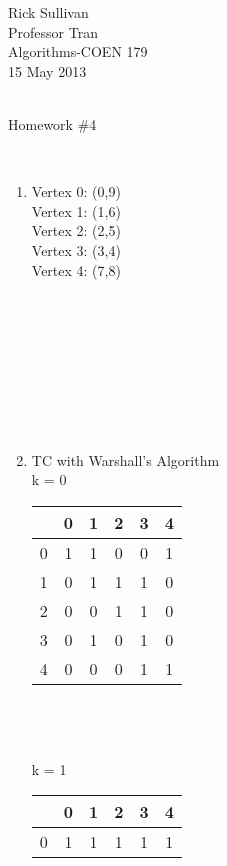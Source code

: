 \documentclass[11pt]{article}
\begin{document}
\noindent   Rick Sullivan   \\
            Professor Tran  \\
            Algorithms-COEN 179 \\
            15 May 2013      \\
                            \\
\centerline{Homework \#4}   \\

\begin{enumerate}
    \item
        Vertex 0: (0,9) \\
        Vertex 1: (1,6) \\
        Vertex 2: (2,5) \\
        Vertex 3: (3,4) \\
        Vertex 4: (7,8) \\
        \\ \\ \\ \\ \\ \\ \\ \\
    \item
        \begin{multicols*}{2}
        TC with Warshall's Algorithm    \\
        k = 0   \\
        \begin{tabular}{c || c | c | c | c | c}
            & 0 & 1 & 2 & 3 & 4    \\ \hline \hline
           0 & 1 & 1 & 0 & 0 & 1    \\ \hline 
           1 & 0 & 1 & 1 & 1 & 0    \\ \hline 
           2 & 0 & 0 & 1 & 1 & 0    \\ \hline 
           3 & 0 & 1 & 0 & 1 & 0    \\ \hline 
           4 & 0 & 0 & 0 & 1 & 1    \\ \hline 
        \end{tabular}
        \\ \\ \\
        k = 1   \\
        \begin{tabular}{c || c | c | c | c | c}
            & 0 & 1 & 2 & 3 & 4    \\ \hline \hline
           0 & 1 & 1 & 1 & 1 & 1    \\ \hline 

\end{tabular}
\end{multicols*}
\end{enumerate}
\end{document}
